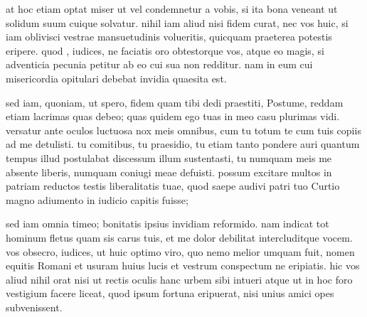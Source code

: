  at hoc etiam optat miser ut vel condemnetur a vobis, si ita bona veneant ut solidum suum cuique solvatur. nihil iam aliud nisi fidem curat, nec vos huic, si iam oblivisci vestrae mansuetudinis volueritis, quicquam praeterea potestis eripere. quod , iudices, ne faciatis oro obtestorque vos, atque eo magis, si adventicia pecunia petitur ab eo cui sua non redditur. nam in eum cui misericordia opitulari debebat invidia quaesita est.

 sed iam, quoniam, ut spero, fidem quam tibi dedi praestiti, Postume, reddam etiam lacrimas quas debeo; quas quidem ego tuas in meo casu plurimas vidi. versatur ante oculos luctuosa nox meis omnibus, cum tu totum te cum tuis copiis ad me detulisti. tu comitibus, tu praesidio, tu etiam tanto pondere auri quantum tempus illud postulabat discessum illum sustentasti, tu numquam meis me absente liberis, numquam coniugi meae defuisti. possum excitare multos in patriam reductos testis liberalitatis tuae, quod saepe audivi patri tuo Curtio magno adiumento in iudicio capitis fuisse;

 sed iam omnia timeo; bonitatis ipsius invidiam reformido. nam indicat tot hominum fletus quam sis carus tuis, et me dolor debilitat intercluditque vocem. vos obsecro, iudices, ut huic optimo viro, quo nemo melior umquam fuit, nomen equitis Romani et usuram huius lucis et vestrum conspectum ne eripiatis. hic vos aliud nihil orat nisi ut rectis oculis hanc urbem sibi intueri atque ut in hoc foro vestigium facere liceat, quod ipsum fortuna eripuerat, nisi unius amici opes subvenissent.
